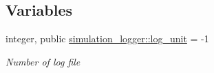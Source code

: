 \subsection*{Variables}
\begin{DoxyCompactItemize}
\item 
integer, public \mbox{\hyperlink{namespacesimulation__logger_a9ef3d703b0c79dd563330003a82c99d9}{simulation\+\_\+logger\+::log\+\_\+unit}} = -\/1
\begin{DoxyCompactList}\small\item\em \textquotesingle{}Number\textquotesingle{} of log file \end{DoxyCompactList}\end{DoxyCompactItemize}
